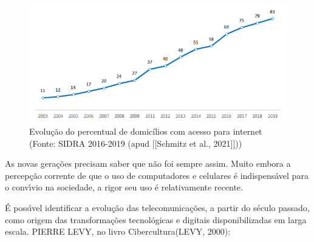 \documentclass[
12pt,		%
openright,	%
twoside,  %
a4paper,			%
chapter=TITLE,		%
english,			%
french,				%
spanish,			%
brazil				%
]{USPSC-classe/USPSC}
\begin{document}
\captionsetup{format=plain}
\begin{figure}[max size={\textwidth}{\textheight}]

\centering


\begin{minipage}[b]{0.4\linewidth}
        \centering
                \includegraphics[width=1.0\linewidth]{../../imagens/acesso-internet.png}
                \caption{Evolu\c{c}\~ao do percentual de domic\'{i}lios com acesso para internet (Fonte: SIDRA 2016-2019  (apud [[Schmitz et al., 2021]]))}
                \label{dc69b8cf40fae2ba00158e43d2db2d294110957c}
\end{minipage}%
\hspace{0.5cm}
\end{figure}



As novas gera\c{c}\~oes precisam saber que n\~ao foi sempre assim. Muito embora a percep\c{c}\~ao corrente de que o uso de computadores e celulares \'e indispens\'avel para o conv\'{\i}vio na sociedade, a rigor seu uso \'e relativamente recente.

















\'E poss\'{\i}vel identificar a evolu\c{c}\~ao das telecomunica\c{c}\~oes, a partir do s\'eculo passado, como origem das transforma\c{c}\~oes tecnol\'ogicas e digitais disponibilizadas em larga escala. PIERRE LEVY, no livro \textquotedbl Cibercultura\textquotedbl  (LEVY, 2000):
\end{document}

